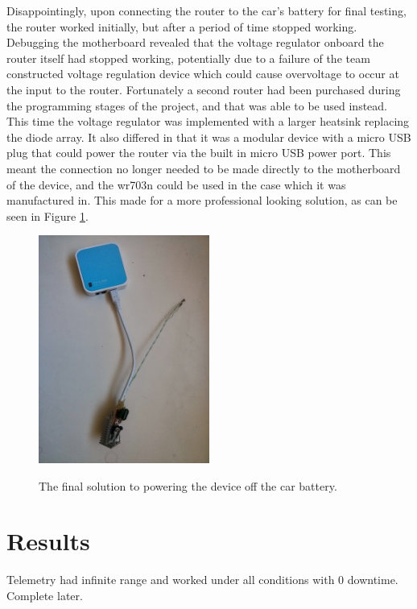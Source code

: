 Disappointingly, upon connecting the router to the car's battery for final testing, the router worked initially, but after a period of time stopped working. Debugging the motherboard revealed that the voltage regulator onboard the router itself had stopped working, potentially due to a failure of the team constructed voltage regulation device which could cause overvoltage to occur at the input to the router. Fortunately a second router had been purchased during the programming stages of the project, and that was able to be used instead. This time the voltage regulator was implemented with a larger heatsink replacing the diode array. It also differed in that it was a modular device with a micro USB plug that could power the router via the built in micro USB power port. This meant the connection no longer needed to be made directly to the motherboard of the device, and the wr703n could be used in the case which it was manufactured in. This made for a more professional looking solution, as can be seen in Figure \ref{TEL_powerv2}.

\begin{figure}[ht]
  \caption{The final solution to powering the device off the car battery.}
  \centering
    \includegraphics[width=0.5\textwidth]{Images/Telemetry/TEL_powerv2.jpg}
    \label{TEL_powerv2}
\end{figure}


\section{Results}
Telemetry had infinite range and worked under all conditions with 0 downtime. Complete later.


\cite{}




